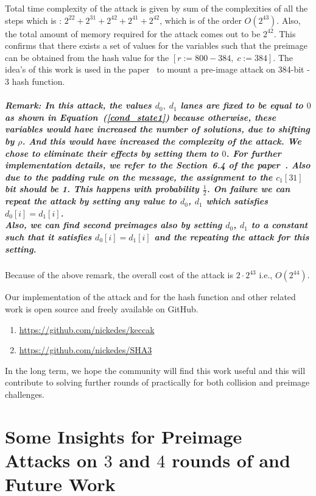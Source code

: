 Total time complexity of the attack is given by sum of the complexities of all the steps which is : $2^{22} + 2^{31} + 2^{42} + 2^{41} + 2^{42}$, which is of the order $O(2^{43})$.
Also, the total amount of memory required for the attack comes out to be $2^{42}$. 
This confirms that there exists a set of values for the variables such that the preimage can be obtained from the hash value for the \KECCAK{}$[r:=800-384,\; c:=384]$. The idea's of this work is used in the paper~\cite{rns2018} to mount a pre-image attack on 384-bit \SHA-$3$ hash function.


\paragraph{Remark:
In this attack, the values $d_0,\;d_1$ lanes are fixed to be equal to $0$ as shown in Equation~(\ref{cond_state1}) because otherwise, these variables would have increased the number of solutions, due to shifting by $\rho$. 
And this would have increased the complexity of the attack. We chose to eliminate their effects by setting them to $0$. For further implementation details, we refer to the Section~6.4 of the paper~\cite{naya2011practical}. Also due to the padding rule on the message, the assignment to the $c_1[31]$ bit should be 1. This happens with probability $\tfrac{1}{2}$. On failure we can repeat the attack by setting any value to $d_0$, $d_1$ which satisfies $d_0[i]=d_1[i]$. \\
Also, we can find second preimages also by setting $d_0$, $d_1$ to a constant such that it satisfies $d_0[i]=d_1[i]$ and the repeating the attack for this setting.
}

Because of the above remark, the overall cost of the attack is $2\cdot 2^{43}$ i.e., $O(2^{44})$.

Our implementation of the attack and for the hash function and other related work is open source and freely available on GitHub.

\begin{enumerate}
    \item \url{https://github.com/nickedes/keccak}
    \item \url{https://github.com/nickedes/SHA3}
\end{enumerate}

In the long term, we hope the community will find this work useful and this will contribute to solving further rounds of \KECCAK{} practically for both collision and preimage challenges.

\chapter{Some Insights for Preimage Attacks on $3$ and $4$ rounds of \KECCAK{} and Future Work}

